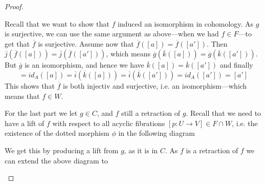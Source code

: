 \begin{proof}
\begin{center}
\end{center}

Recall that we want to show that $f$ induced an isomorphism in cohomology. As $g$ is surjective, we can use the same argument as above---when we had $f\in F$---to get that $\overline{f}$ is surjective. Assume now that $\overline{f}([a]) = \overline{f}([a'])$. Then $\overline{j}(\overline{f}([a])) = \overline{j}(\overline{f}([a']))$, which means $\overline{g}(\overline{k}([a])) = \overline{g}(\overline{k}([a']))$. But $\overline{g}$ is an isomorphism, and hence we have $\overline{k}([a]) = \overline{k}([a'])$ and finally
\begin{equation*}
    [a] = id_A([a]) = \overline{i}(\overline{k}([a])) = \overline{i}(\overline{k}([a'])) = id_A([a']) = [a']
\end{equation*}
This shows that $\overline{f}$ is both injectiv and surjective, i.e. an isomorphism---which means that $f\in W$. 

For the last part we let $g\in C$, and $f$ still a retraction of $g$. Recall that we need to have a lift of $f$ with respect to all acyclic fibrations $[p\colon U\longrightarrow V]\in F\cap W$, i.e. the existence of the dotted morphism $\phi$ in the following diagram
\begin{center}
\end{center}

We get this by producing a lift from $g$, as it is in $C$. As $f$ is a retraction of $f$ we can extend the above diagram to 
\begin{center}
\end{center}
\end{proof}
